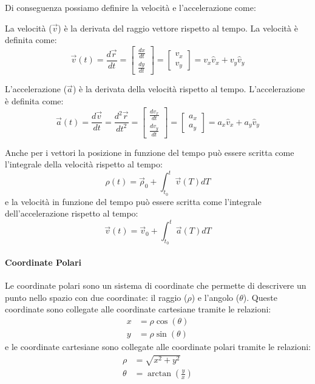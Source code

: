         Di conseguenza possiamo definire la velocità e l'accelerazione come:
        \begin{definition}[Velocità]
            La velocità ($\vec{v}$) è la derivata del raggio vettore rispetto al tempo. La velocità è definita come:
            $$
                \vec{v}(t) = \frac{d\vec{r}}{dt} = \begin{bmatrix} \frac{dx}{dt}\\ \frac{dy}{dt} \end{bmatrix} = \begin{bmatrix} v_x\\ v_y \end{bmatrix} = v_x\hat{v}_x+v_y\hat{v}_y
            $$
        \end{definition}
        \begin{definition}[Accelerazione]
            L'accelerazione ($\vec{a}$) è la derivata della velocità rispetto al tempo. L'accelerazione è definita come:
            $$
                \vec{a}(t) = \frac{d\vec{v}}{dt} = \frac{d^2\vec{r}}{dt^2} = \begin{bmatrix} \frac{dv_x}{dt}\\ \frac{dv_y}{dt} \end{bmatrix} = \begin{bmatrix} a_x\\ a_y \end{bmatrix} = a_x\hat{v}_x+a_y\hat{v}_y
            $$
        \end{definition}
        Anche per i vettori la posizione in funzione del tempo può essere scritta come l'integrale della velocità rispetto al tempo:
        $$
            \rho(t) = \vec{\rho}_0 + \int_{t_0}^{t} \vec{v}(T)dT
        $$
        e la velocità in funzione del tempo può essere scritta come l'integrale dell'accelerazione rispetto al tempo:
        $$
            \vec{v}(t) = \vec{v}_0 + \int_{t_0}^{t} \vec{a}(T)dT
        $$
        \paragraph{Coordinate Polari}
            Le coordinate polari sono un sistema di coordinate che permette di descrivere un punto nello spazio con due coordinate: il raggio ($\rho$) e l'angolo ($\theta$). Queste coordinate sono collegate alle coordinate cartesiane tramite le relazioni:
            $$
                \begin{aligned}
                    x &= \rho\cos(\theta)\\
                    y &= \rho\sin(\theta)
                \end{aligned}
            $$
            e le coordinate cartesiane sono collegate alle coordinate polari tramite le relazioni:
            $$
                \begin{aligned}
                    \rho &= \sqrt{x^2+y^2}\\
                    \theta &= \arctan\left(\frac{y}{x}\right)
                \end{aligned}
            $$
